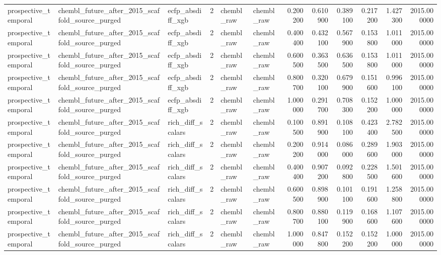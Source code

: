 \begin{longtable}{lllrllrrrrrr}
prospective\_temporal & chembl\_future\_after\_2015\_scaffold\_source\_purged & ecfp\_absdiff\_xgb & 2 & chembl\_raw & chembl\_raw & 0.200200 & 0.610900 & 0.389100 & 0.217200 & 1.427300 & 2015.000000 \\
prospective\_temporal & chembl\_future\_after\_2015\_scaffold\_source\_purged & ecfp\_absdiff\_xgb & 2 & chembl\_raw & chembl\_raw & 0.400400 & 0.432100 & 0.567900 & 0.153800 & 1.011000 & 2015.000000 \\
prospective\_temporal & chembl\_future\_after\_2015\_scaffold\_source\_purged & ecfp\_absdiff\_xgb & 2 & chembl\_raw & chembl\_raw & 0.600500 & 0.363500 & 0.636500 & 0.153800 & 1.011000 & 2015.000000 \\
prospective\_temporal & chembl\_future\_after\_2015\_scaffold\_source\_purged & ecfp\_absdiff\_xgb & 2 & chembl\_raw & chembl\_raw & 0.800700 & 0.320100 & 0.679900 & 0.151600 & 0.996100 & 2015.000000 \\
prospective\_temporal & chembl\_future\_after\_2015\_scaffold\_source\_purged & ecfp\_absdiff\_xgb & 2 & chembl\_raw & chembl\_raw & 1.000000 & 0.291700 & 0.708300 & 0.152200 & 1.000000 & 2015.000000 \\
prospective\_temporal & chembl\_future\_after\_2015\_scaffold\_source\_purged & rich\_diff\_scalars & 2 & chembl\_raw & chembl\_raw & 0.100500 & 0.891900 & 0.108100 & 0.423400 & 2.782500 & 2015.000000 \\
prospective\_temporal & chembl\_future\_after\_2015\_scaffold\_source\_purged & rich\_diff\_scalars & 2 & chembl\_raw & chembl\_raw & 0.200200 & 0.914000 & 0.086000 & 0.289600 & 1.903000 & 2015.000000 \\
prospective\_temporal & chembl\_future\_after\_2015\_scaffold\_source\_purged & rich\_diff\_scalars & 2 & chembl\_raw & chembl\_raw & 0.400400 & 0.907200 & 0.092800 & 0.228500 & 1.501600 & 2015.000000 \\
prospective\_temporal & chembl\_future\_after\_2015\_scaffold\_source\_purged & rich\_diff\_scalars & 2 & chembl\_raw & chembl\_raw & 0.600500 & 0.898900 & 0.101100 & 0.191600 & 1.258800 & 2015.000000 \\
prospective\_temporal & chembl\_future\_after\_2015\_scaffold\_source\_purged & rich\_diff\_scalars & 2 & chembl\_raw & chembl\_raw & 0.800700 & 0.880100 & 0.119900 & 0.168600 & 1.107600 & 2015.000000 \\
prospective\_temporal & chembl\_future\_after\_2015\_scaffold\_source\_purged & rich\_diff\_scalars & 2 & chembl\_raw & chembl\_raw & 1.000000 & 0.847800 & 0.152200 & 0.152200 & 1.000000 & 2015.000000 \\

\end{longtable}
